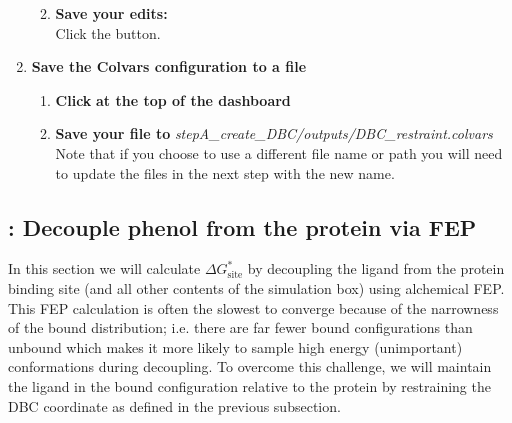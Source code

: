 \documentclass[9pt,tutorial]{Styling/livecoms}
\newcommand{\filepath}[1]{\textit{#1}}
\newcommand{\button}[1]{
  \inlineBox[gray]{\texttt{#1}}
}
\begin{document}
\begin{enumerate}
\begin{enumerate}[label=\alph*., ref=\theenumi.\alph*]
\begin{itemize}
            \end{itemize}
            \item \textbf{Save your edits:}\\
            Click the \button{Apply [Ctrl-s]} button.
        \end{enumerate}
        \item \textbf{Save the Colvars configuration to a file}
        \begin{enumerate}[label=\alph*., ref=\theenumi.\alph*]
            \item \textbf{Click} \button{Save} \textbf{at the top of the dashboard}
            \item \textbf{Save your file to} \filepath{stepA\_create\_DBC/outputs/DBC\_restraint.colvars}\\
            Note that if you choose to use a different file name or path you will need to update the files in the next step with the new name.
        \end{enumerate}
    \end{enumerate}

\subsection{\hspace{-1em}: Decouple phenol from the protein via FEP}\label{step:proteinDecouple}
    \begin{tcolorbox}[colback=blue!5!white,colframe=blue!75!black]
    In this section we will calculate $\Delta G_\mathrm{site}^*$ by decoupling the ligand from the protein binding site (and all other contents of the simulation box) using alchemical FEP. This FEP calculation is often the slowest to converge because of the narrowness of the bound distribution; i.e. there are far fewer bound configurations than unbound which makes it more likely to sample high energy (unimportant) conformations during decoupling. 
    To overcome this challenge, we will maintain the ligand in the bound configuration relative to the protein by restraining the DBC coordinate as defined in the previous subsection.
    \end{tcolorbox}
    
\end{document}
